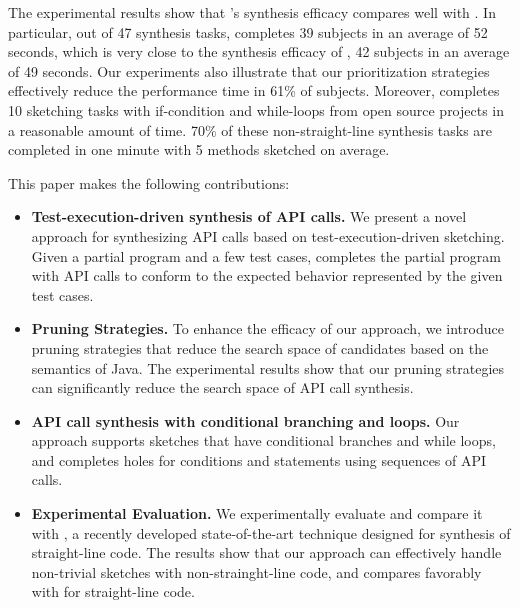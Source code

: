  The experimental results show that \tool's synthesis efficacy compares well with \spt. In particular, out of 47 synthesis tasks, \tool completes 39 subjects in an average of 52 seconds, which is very close to the synthesis efficacy of \spt, 42 subjects in an average of 49 seconds.  Our experiments also  illustrate that our prioritization strategies effectively reduce the performance time in 61\% of subjects. Moreover, \tool completes 10 sketching tasks with if-condition and while-loops from open source projects in a reasonable amount of time. 70\% of these non-straight-line synthesis tasks are completed in one minute with 5 methods sketched on average.  


 This paper makes the following contributions:
 
 \begin{itemize}
 \item \textbf{Test-execution-driven synthesis of API calls.}  We
   present a novel approach for synthesizing API calls based on
   test-execution-driven sketching. Given a partial program and a few
   test cases, \tool completes the partial program with API calls to
   conform to the expected behavior represented by the given test
   cases.
 \item \textbf{Pruning Strategies.  }  To enhance the efficacy of our
   approach, we introduce pruning strategies that reduce the search
   space of candidates based on the semantics of Java.  The
   experimental results show that our pruning strategies can
   significantly reduce the search space of API call synthesis.
 \item \textbf{API call synthesis with conditional branching and
   loops.  }  Our approach supports sketches that have conditional
   branches and while loops, and completes holes for conditions and
   statements using sequences of API calls.  
 \item \textbf{Experimental Evaluation.  }  We experimentally evaluate
   \tool and compare it with \spt, a recently developed
   state-of-the-art technique designed for synthesis of straight-line
   code. The results show that our approach can effectively handle
   non-trivial sketches with non-strainght-line code, and compares
   favorably with \spt for straight-line code.
  \end{itemize}









